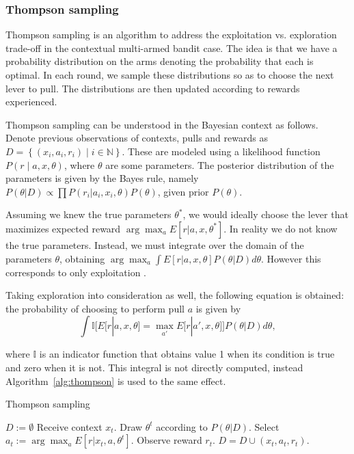 \documentclass{article} %
\newcommand{\setof}[1]{\ensuremath{\left \{ #1 \right \}}}
\begin{document}
\subsubsection{Thompson sampling}
Thompson sampling \cite{chapelle2011empirical} is an algorithm to address the
exploitation vs. exploration trade-off in the contextual multi-armed bandit
case. The idea is that we have a probability distribution on the arms denoting
the probability that each is optimal. In each round, we sample these
distributions so as to choose the next lever to pull. The distributions are
then updated according to rewards experienced.

Thompson sampling can be understood in the Bayesian context as follows. Denote
previous observations of contexts, pulls and rewards as $D = \setof{(x_i, a_i,
r_i) \;|\; i \in \mathbb{N}}$. These are modeled using a likelihood function
$P(r \;|\; a,x,\theta)$, where $\theta$ are some parameters. The posterior
distribution of the parameters is given by the Bayes rule, namely $P(\theta |
D) \propto \prod P(r_i | a_i, x_i, \theta) P(\theta)$, given prior $P(\theta)$.

Assuming we knew the true parameters $\theta^*$, we would ideally choose the
lever that maximizes expected reward $\arg\max_a E[r | a, x, \theta^*]$. In
reality we do not know the true parameters. Instead, we must integrate over the
domain of the parameters $\theta$, obtaining $\arg\max_a \int E[r | a, x,
\theta] P(\theta|D) d\theta$. However this corresponds to only exploitation
\cite{chapelle2011empirical}.

Taking exploration into consideration as well, the following equation is
obtained: the probability of choosing to perform pull $a$ is given by
\begin{equation}
  \int \mathbb{I}\bigg[E[r|a,x,\theta] = \max_{a'}
  E\big[r|a',x,\theta\big]\bigg] P(\theta | D) d\theta,
\end{equation}

where $\mathbb{I}$ is an indicator function that obtains value 1 when its
condition is true and zero when it is not.  This integral is not directly
computed, instead Algorithm~\ref{alg:thompson} is used to the same effect.

\begin{algorithm}
  \caption{Thompson sampling \cite{chapelle2011empirical}}
  \label{alg:thompson}
  \begin{algorithmic}[1]
    \State $D := \emptyset$
      \State Receive context $x_t$.
      \State Draw $\theta^t$ according to $P(\theta | D)$.
      \State Select $a_t := \arg\max_a E[r | x_t, a, \theta^t]$.
      \State Observe reward $r_t$.
      \State $D = D \cup (x_t, a_t, r_t)$.
    \EndFor
  \end{algorithmic}
\end{algorithm}
\end{document}
